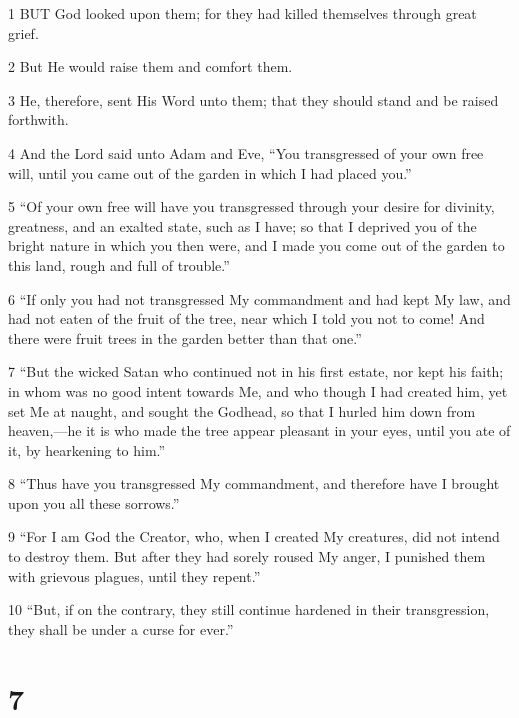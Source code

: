 \par 1 BUT God looked upon them; for they had killed themselves through great grief.

\par 2 But He would raise them and comfort them.

\par 3 He, therefore, sent His Word unto them; that they should stand and be raised forthwith.

\par 4 And the Lord said unto Adam and Eve, “You transgressed of your own free will, until you came out of the garden in which I had placed you.”

\par 5 “Of your own free will have you transgressed through your desire for divinity, greatness, and an exalted state, such as I have; so that I deprived you of the bright nature in which you then were, and I made you come out of the garden to this land, rough and full of trouble.”

\par 6 “If only you had not transgressed My commandment and had kept My law, and had not eaten of the fruit of the tree, near which I told you not to come! And there were fruit trees in the garden better than that one.”

\par 7 “But the wicked Satan who continued not in his first estate, nor kept his faith; in whom was no good intent towards Me, and who though I had created him, yet set Me at naught, and sought the Godhead, so that I hurled him down from heaven,—he it is who made the tree appear pleasant in your eyes, until you ate of it, by hearkening to him.”

\par 8 “Thus have you transgressed My commandment, and therefore have I brought upon you all these sorrows.”

\par 9 “For I am God the Creator, who, when I created My creatures, did not intend to destroy them. But after they had sorely roused My anger, I punished them with grievous plagues, until they repent.”

\par 10 “But, if on the contrary, they still continue hardened in their transgression, they shall be under a curse for ever.”

\chapter{7}

